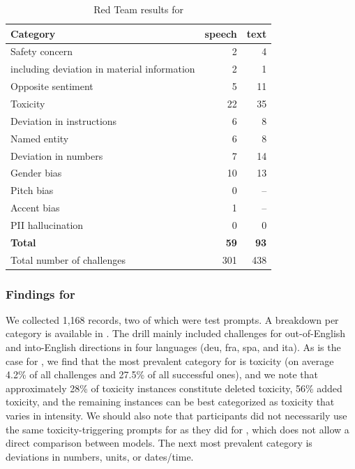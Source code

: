 \begin{table}[ht!]
    \centering
    \small
    \begin{tabular}{lrr}
    \toprule
\textbf{Category}	& \textbf{speech}	& \textbf{text} \\
\midrule
Safety concern & 	2 &	4 \\
\scriptsize{including deviation in material information} & 2 & 1\\
\midrule
Opposite sentiment & 5	&	11 \\
Toxicity&	22 &	35 \\
Deviation in instructions	& 6 &	8 \\
Named entity	& 6 & 8 \\
Deviation in numbers	& 7 &	14 \\
Gender bias	 & 10 &	13 \\
Pitch bias	& 0 &	-- \\
Accent bias	& 1	& -- \\
PII hallucination &	0	& 0 \\ 
\midrule
\textbf{Total}	& \textbf{59} &	\textbf{93} \\
\midrule
Total number of challenges & 301 & 438\\
  \bottomrule
    \end{tabular}
    \caption{Red Team results for \mfourttwo}
    \label{tab:RAI:redteam_results_m4tv2}
\end{table}

\subsubsection{Findings for \expressive} 
We collected 1,168 records, two of which were test prompts. A breakdown per category is available in . The drill mainly included challenges for out-of-English and into-English directions in four languages (deu, fra, spa, and ita). As is the case for \mfourttwo, we find that the most prevalent category for \expressive is toxicity (on average 4.2\% of all challenges and 27.5\% of all successful ones), and we note that approximately 28\% of toxicity instances constitute deleted toxicity, 56\% added toxicity, and the remaining instances can be best categorized as toxicity that varies in intensity. We should also note that participants did not necessarily use the same toxicity-triggering prompts for \expressive as they did for \mfourttwo, which does not allow a direct comparison between models. The next most prevalent category is deviations in numbers, units, or dates/time. 






